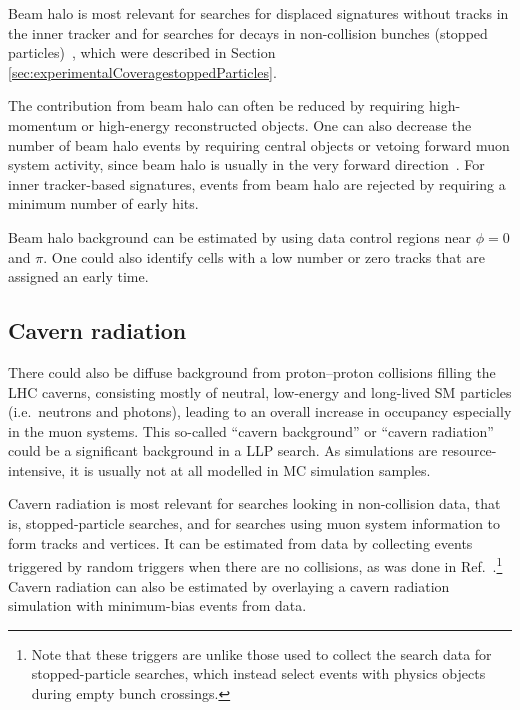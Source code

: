 Beam halo is most relevant for searches for displaced signatures without tracks in the inner tracker and for searches for decays in non-collision bunches (stopped particles)~\cite{Khachatryan:2015jha, Chatrchyan:2012dxa, Khachatryan:2010uf}, which were described in Section \ref{sec:experimentalCoveragestoppedParticles}.

The contribution from beam halo can often be reduced by requiring high-momentum or high-energy reconstructed objects. One can also decrease the number of beam halo events by requiring central objects or vetoing forward muon system activity, since beam halo is usually in the very forward direction~\cite{Khachatryan:2015jha, Chatrchyan:2012dxa, Khachatryan:2010uf}. For inner tracker-based signatures, events from beam halo are rejected by requiring a minimum number of early hits.

Beam halo background can be estimated by using data control regions near $\phi=0$ and $\pi$. One could also identify cells with a low number or zero tracks that are assigned an early time. %

\subsection{Cavern radiation} %

There could also be diffuse background from proton--proton collisions filling the LHC caverns, consisting mostly of neutral, low-energy and long-lived SM particles (i.e.\ neutrons and photons), leading to an overall increase in occupancy especially in the muon systems. This so-called ``cavern background'' or ``cavern radiation'' could be a significant background in a LLP search. As simulations are resource-intensive, it is usually not at all modelled in MC simulation samples.

Cavern radiation is most relevant for searches looking in non-collision data, that is, stopped-particle searches, and for searches using muon system information to form tracks and vertices. It can be estimated from data by collecting events triggered by random triggers when there are no collisions, as was done in Ref.~\cite{Aad:2013gva}.\footnote{Note that these triggers are unlike those used to collect the search data for stopped-particle searches, which instead select events with physics objects during empty bunch crossings.} Cavern radiation can also be estimated by overlaying a cavern radiation simulation with minimum-bias events from data.

